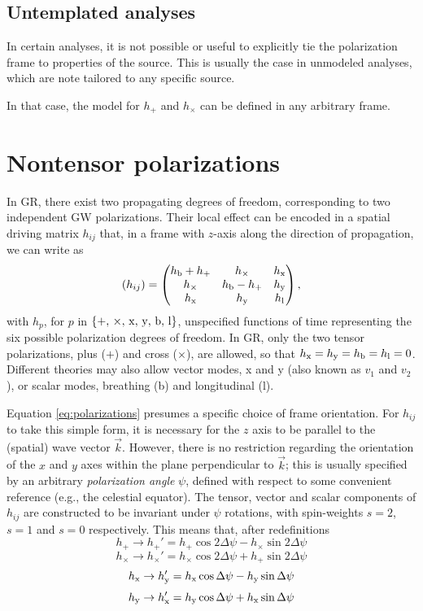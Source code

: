 \documentclass[aps,prd,twocolumn,superscriptaddress,preprintnumbers,floatfix,nofootinbib]{revtex4-2}
\newcommand{\beq}{\begin{equation}}
\newcommand{\eeq}{\end{equation}}
\newcommand*{\mi}[1]{}
\newcommand*{\mi}[1]{{\color{magenta} [{\bf MAX}: #1]}}
\begin{document}
\mi{identify 3 different angles: $\psi$, $\Psi$, $\theta$}

\subsection{Untemplated analyses}

In certain analyses, it is not possible or useful to explicitly tie the polarization frame to properties of the source.
This is usually the case in unmodeled analyses, which are note tailored to any specific source.
\mi{also true for ringdowns, if we don't have a model for the amplitudes}
In that case, the model for $h_+$ and $h_\times$ can be defined in any arbitrary frame.

\section{Nontensor polarizations}

\newcommand{\hx}{h_{\rm x}}
\newcommand{\hy}{h_{\rm y}}
\newcommand{\hb}{h_{\rm b}}
\newcommand{\hlon}{h_{\rm l}}

In GR, there exist two propagating degrees of freedom, corresponding to two independent GW polarizations.
Their local effect can be encoded in a spatial driving matrix $h_{ij}$ that, in a frame with $z$-axis along the direction of propagation, we can write as
\beq \label{eq:polarizations}
(h_{ij}) = \begin{pmatrix}
\hb + h_+ & h_\times  & \hx  \\
h_\times  & \hb - h_+ & \hy  \\
\hx    & \hy    & \hlon
\end{pmatrix} ,
\eeq
with $h_p$, for $p$ in $\{+,\, \times,\, {\rm x},\, {\rm y},\, {\rm b},\, {\rm l}\}$, unspecified functions of time representing the six possible polarization degrees of freedom.
In GR, only the two tensor polarizations, plus ($+$) and cross ($\times$), are allowed, so that $\hx=\hy=\hb=\hlon=0$.
Different theories may also allow vector modes, x and y (also known as $v_1$ and $v_2$), or scalar modes, breathing (b) and longitudinal (l).

Equation \eqref{eq:polarizations} presumes a specific choice of frame orientation.
For $h_{ij}$ to take this simple form, it is necessary for the $z$ axis to be parallel to the (spatial) wave vector $\vec{k}$.
However, there is no restriction regarding the orientation of the $x$ and $y$ axes within the plane perpendicular to $\vec{k}$; this is usually specified by an arbitrary \emph{polarization angle} $\psi$, defined with respect to some convenient reference (e.g., the celestial equator).
The tensor, vector and scalar components of $h_{ij}$ are constructed to be invariant under $\psi$ rotations, with spin-weights $s=2$, $s=1$ and $s=0$ respectively.
This means that, after redefinitions
\beq
h_+ \rightarrow h_+' = h_+ \cos 2\Delta \psi - h_\times \sin 2\Delta\psi 
\eeq
\beq
h_\times \rightarrow h_\times' = h_\times \cos 2\Delta \psi + h_+ \sin 2\Delta\psi 
\eeq
\beq
\hx \rightarrow \hy' = \hx \cos \Delta \psi - \hy \sin \Delta\psi 
\eeq
\beq
\hy \rightarrow \hx' = \hy \cos \Delta \psi + \hx \sin \Delta\psi 
\eeq
\end{document}
